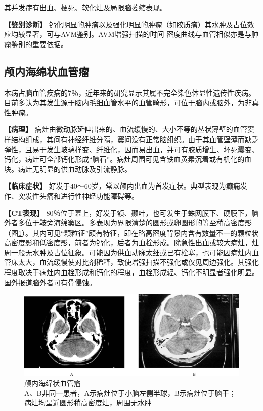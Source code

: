 其并发症有出血、梗死、软化灶及局限脑萎缩表现。

\textbf{【鉴别诊断】}
钙化明显的肿瘤以及强化明显的肿瘤（如胶质瘤）其水肿及占位效应均较显著，可与AVM鉴别。AVM增强扫描的时间-密度曲线与血管相似亦是与肿瘤鉴别的重要依据。

\subsection{颅内海绵状血管瘤}

本病占脑血管疾病的7％，近年来的研究显示其属不完全染色体显性遗传性疾病。目前多认为其发生源于脑内毛细血管水平的血管畸形，可位于脑内或脑外，为非真性肿瘤。

\textbf{【病理】}
病灶由微动脉延伸出来的、血流缓慢的、大小不等的丛状薄壁的血管窦样结构组成，其间有神经纤维分隔，窦间没有正常脑组织。由于其血管壁薄而缺乏弹性，且易于发生玻璃样变、纤维化，因而易出血，并可有胶质增生、坏死囊变、钙化，病灶可全部钙化形成“脑石”。病灶周围可见含铁血黄素沉着或有机化的血块。病灶无明显的供血动脉及引流静脉。

\textbf{【临床症状】}
好发于40～60岁，常以颅内出血为首发症状。典型表现为癫痫发作、突发性头痛和进行性神经功能障碍等。

\textbf{【CT表现】}
80％位于幕上，好发于额、颞叶，也可发生于蛛网膜下、硬膜下，脑外者多位于鞍旁海绵窦区。多表现为界限清楚的圆形或卵圆形的等至稍高密度影（图\ref{fig2-28}）。其内可见“颗粒征”颇有特征，即在略高密度背景内含有数量不一的颗粒状高密度影和低密度影，前者为钙化，后者为血栓形成。除急性出血或较大病灶，灶周一般无水肿及占位征象。可能因为供血动脉太细或已有栓塞，也可能因病灶内血管床太大，血流缓慢使对比剂稀释，致使增强扫描不强化或仅见周边强化。其强化程度取决于病灶内血栓形成和钙化的程度，血栓形成轻、钙化不明显者强化明显。国外报道脑外者可有骨侵蚀。

\begin{figure}[!htbp]
 \centering
 \includegraphics[width=.7\textwidth,height=\textheight,keepaspectratio]{./images/Image00047.jpg}
 \captionsetup{justification=centering}
 \caption{颅内海绵状血管瘤\\{\small A、B非同一患者，A示病灶位于小脑左侧半球，B示病灶位于脑干；病灶均呈近圆形稍高密度灶，周围无水肿}}
 \label{fig2-28}
  \end{figure} 

